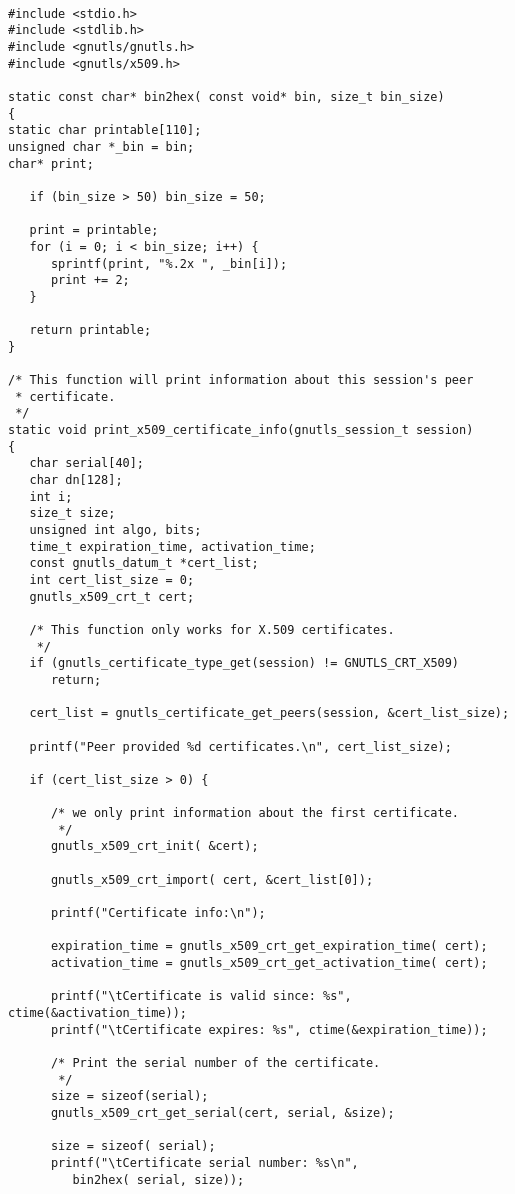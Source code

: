 \begin{verbatim}

#include <stdio.h>
#include <stdlib.h>
#include <gnutls/gnutls.h>
#include <gnutls/x509.h>

static const char* bin2hex( const void* bin, size_t bin_size)
{
static char printable[110];
unsigned char *_bin = bin;
char* print;

   if (bin_size > 50) bin_size = 50;

   print = printable;
   for (i = 0; i < bin_size; i++) {
      sprintf(print, "%.2x ", _bin[i]);
      print += 2;
   }

   return printable;
}

/* This function will print information about this session's peer
 * certificate. 
 */
static void print_x509_certificate_info(gnutls_session_t session)
{
   char serial[40];
   char dn[128];
   int i;
   size_t size;
   unsigned int algo, bits;
   time_t expiration_time, activation_time;
   const gnutls_datum_t *cert_list;
   int cert_list_size = 0;
   gnutls_x509_crt_t cert;

   /* This function only works for X.509 certificates.
    */
   if (gnutls_certificate_type_get(session) != GNUTLS_CRT_X509)
      return;

   cert_list = gnutls_certificate_get_peers(session, &cert_list_size);

   printf("Peer provided %d certificates.\n", cert_list_size);

   if (cert_list_size > 0) {

      /* we only print information about the first certificate.
       */
      gnutls_x509_crt_init( &cert);

      gnutls_x509_crt_import( cert, &cert_list[0]);

      printf("Certificate info:\n");

      expiration_time = gnutls_x509_crt_get_expiration_time( cert);
      activation_time = gnutls_x509_crt_get_activation_time( cert);

      printf("\tCertificate is valid since: %s", ctime(&activation_time));
      printf("\tCertificate expires: %s", ctime(&expiration_time));

      /* Print the serial number of the certificate.
       */
      size = sizeof(serial);
      gnutls_x509_crt_get_serial(cert, serial, &size);

      size = sizeof( serial);
      printf("\tCertificate serial number: %s\n", 
         bin2hex( serial, size));


\end{verbatim}
